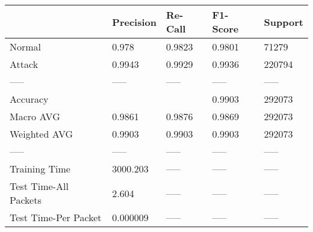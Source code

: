 \begin{tabular}{lllll}
\toprule
{} & Precision & Re-Call & F1-Score & Support \\
\midrule
Normal                &     0.978 &  0.9823 &   0.9801 &   71279 \\
Attack                &    0.9943 &  0.9929 &   0.9936 &  220794 \\
-----                 &     ----- &   ----- &    ----- &   ----- \\
Accuracy              &           &         &   0.9903 &  292073 \\
Macro AVG             &    0.9861 &  0.9876 &   0.9869 &  292073 \\
Weighted AVG          &    0.9903 &  0.9903 &   0.9903 &  292073 \\
-----                 &     ----- &   ----- &    ----- &   ----- \\
Training Time         &  3000.203 &   ----- &    ----- &   ----- \\
Test Time-All Packets &     2.604 &   ----- &    ----- &   ----- \\
Test Time-Per Packet  &  0.000009 &   ----- &    ----- &   ----- \\
\bottomrule
\end{tabular}
